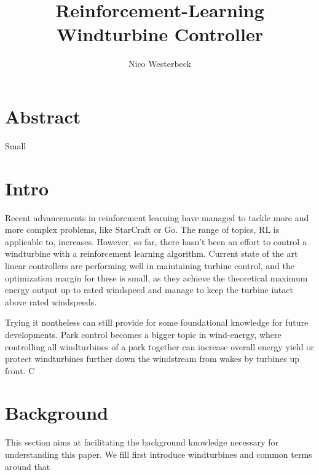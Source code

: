 \documentclass[hyperref,german,beleg]{cgvpub}
\author{Nico Westerbeck}
\title{Reinforcement-Learning Windturbine Controller}
\begin{document}
\chapter{Abstract}
Small 


\chapter{Intro}

Recent advancements in reinforcment learning have managed to tackle more and more complex problems, like StarCraft or Go. The range of topics, RL is applicable to, increases. However, so far, there hasn't been an effort to control a windturbine with a reinforcement learning algorithm. Current state of the art linear controllers are performing well in maintaining turbine control, and the optimization margin for these is small, as they achieve the theoretical maximum energy output up to rated windspeed and manage to keep the turbine intact above rated windspeeds.

Trying it nontheless can still provide for some foundational knowledge for future developments. Park control becomes a bigger topic in wind-energy, where controlling all windturbines of a park together can increase overall energy yield or protect windturbines further down the windstream from wakes by turbines up front. C


\chapter{Background}

This section aims at facilitating the background knowledge necessary for understanding this paper. We fill first introduce windturbines and common terms around that
\end{document}
